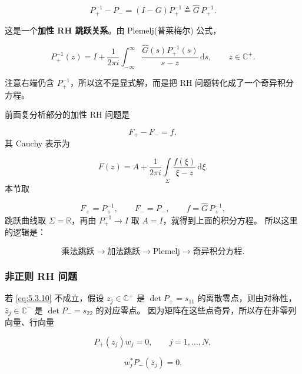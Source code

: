 \documentclass[
    lang=cn,
    scheme=chinese,
    mode=simple,
    device=normal,
    color=blue,
    math=cm,
    thmcnt=section,
    12pt,
    nowatermark
]{elegantbook}
\begin{document}
\[
    P_+^{-1}-P_-
    =
    (I-G)P_+^{-1}
    \triangleq
    \widehat G\,P_+^{-1}.
\]

这是一个\textbf{加性 RH 跳跃关系}。由 Plemelj(普莱梅尔) 公式，

\[
    P_+^{-1}(z)
    =
    I+
    \dfrac{1}{2\pi i}
    \int_{-\infty}^{\infty}
    \dfrac{\widehat G(s)P_+^{-1}(s)}{s-z}\,\mathrm ds,
    \qquad
    z\in\mathbb{C}^+.
\]

注意右端仍含 $P_+^{-1}$，所以这不是显式解，而是把 RH 问题转化成了一个奇异积分方程。

\begin{callout}
    前面复分析部分的加性 RH 问题是

    \[
        F_+-F_-=f,
    \]
    其 Cauchy 表示为

    \[
        F(z)
        =
        A+
        \dfrac{1}{2\pi i}
        \int\limits_\Sigma
        \dfrac{f(\xi)}{\xi-z}\,\mathrm d\xi.
    \]
    本节取

    \[
        F_+=P_+^{-1},
        \qquad
        F_-=P_-,
        \qquad
        f=\widehat G\,P_+^{-1},
    \]
    跳跃曲线取 $\Sigma=\mathbb{R}$，再由 $P_+^{-1}\to I$ 取 $A=I$，就得到上面的积分方程。
    所以这里的逻辑是：

    \[
        \text{乘法跳跃}
        \longrightarrow
        \text{加法跳跃}
        \longrightarrow
        \text{Plemelj}
        \longrightarrow
        \text{奇异积分方程}.
    \]

\end{callout}

\subsubsection{非正则 RH 问题}

若 \eqref{eq:5.3.10} 不成立，假设 $z_j\in\mathbb{C}^+$ 是 $\det P_+=s_{11}$ 的离散零点，则由对称性，$\bar z_j\in\mathbb{C}^-$ 是 $\det P_-=s_{22}$ 的对应零点。
因为矩阵在这些点奇异，所以存在非零列向量、行向量

\begin{equation}
    P_+(z_j)w_j=0,
    \qquad j=1,\ldots,N,
    \tag{5.3.11}
    \label{eq:5.3.11}
\end{equation}

\begin{equation}
    w_j^*P_-(\bar z_j)=0.
    \tag{5.3.12}
    \label{eq:5.3.12}
\end{equation}
\end{document}
